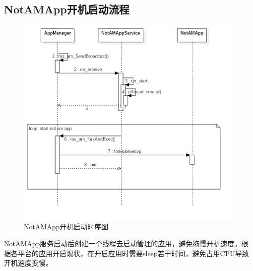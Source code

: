\subsection{NotAMApp开机启动流程}
\begin{figure}[H]
  \centering
  \includegraphics[width=\textwidth]{image/tbrw2_app_optimization/png/start_not_am_app.png}
  \caption{NotAMApp开机启动时序图}
\end{figure}
NotAMApp服务启动后创建一个线程去启动管理的应用，避免拖慢开机速度。根据各平台的应用开启现状，在开启应用时需要sleep若干时间，避免占用CPU导致开机速度变慢。

